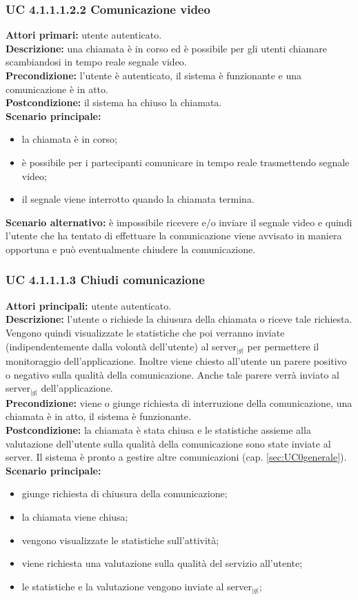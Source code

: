 \subsubsection{UC 4.1.1.1.2.2 Comunicazione video}
\noindent
\textbf{Attori primari:} utente autenticato.\\
\textbf{Descrizione:} una chiamata è in corso ed è possibile per gli utenti chiamare scambiandosi in tempo reale segnale video.\\
\textbf{Precondizione:} l'utente è autenticato, il sistema è funzionante e una comunicazione è in atto.\\
\textbf{Postcondizione:} il sistema ha chiuso la chiamata.\\
\textbf{Scenario principale:}
\begin{itemize}
\item la chiamata è in corso;
\item è possibile per i partecipanti comunicare in tempo reale trasmettendo segnale video;
\item il segnale viene interrotto quando la chiamata termina.
\end{itemize}
\textbf{Scenario alternativo:} è impossibile ricevere e/o inviare il segnale video e quindi l'utente che ha tentato di effettuare la comunicazione viene avvisato in maniera opportuna e può eventualmente chiudere la comunicazione.

\subsubsection{UC 4.1.1.1.3 Chiudi comunicazione}
\noindent 
\textbf{Attori principali:} utente autenticato.\\
\textbf{Descrizione:} l'utente o richiede la chiusura della chiamata o riceve tale richiesta. Vengono quindi visualizzate le statistiche che poi verranno inviate (indipendentemente dalla volontà dell'utente) al server$_{|g|}$ per permettere il monitoraggio dell'applicazione. Inoltre viene chiesto all'utente un parere positivo o negativo sulla qualità della comunicazione. Anche tale parere verrà inviato al server$_{|g|}$ dell'applicazione.\\
\textbf{Precondizione:} viene o giunge richiesta di interruzione della comunicazione, una chiamata è in atto, il sistema è funzionante.\\
\textbf{Postcondizione:} la chiamata è stata chiusa e le statistiche assieme alla valutazione dell'utente sulla qualità della comunicazione sono state inviate al server. Il sistema è pronto a gestire altre comunicazioni (cap. \ref{sec:UC0generale}).\\
\textbf{Scenario principale:}
\begin{itemize}
\item giunge richiesta di chiusura della comunicazione;
\item la chiamata viene chiusa;
\item vengono visualizzate le statistiche sull'attività;
\item viene richiesta una valutazione sulla qualità del servizio all'utente;
\item le statistiche e la valutazione vengono inviate al server$_{|g|}$;
\end{itemize}

